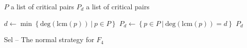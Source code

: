 \begin{algorithm}[ht]
  \begin{algorithmic}[1]
    \Require
      \Statex $P$ a list of critical pairs
    \Ensure
      \Statex $P_d$ a list of critical pairs
      \Statex

    \State $d \gets \min\left\{\textrm{deg}(\textrm{lcm}(p))\ |\ p\in P\right\}$
    \State $P_d \gets \left\{p\in P\ |\ \textrm{deg}(\textrm{lcm}(p)) = d\right\}$
    \State \Return $P_d$
  \end{algorithmic}
  \caption{Sel -- The normal strategy for $F_4$}
  \label{alg:sel}
\end{algorithm}

